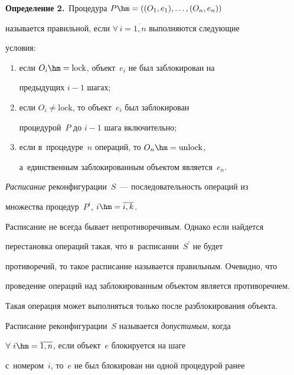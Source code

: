 \noindent


  \textbf{Определение 2.}\ Процедура $P\hm= ((O_1, e_1),\ldots , (O_n,e_n))$ 


называется правильной, если $\forall\,i=\overline{1,n}$ выполняются следующие 


условия:


  \begin{enumerate}[(1)]


\item если $O_i\hm= \mathrm{lock}$, объект~$e_i$ не был заблокирован на 


предыдущих $i-1$ шагах;


\item если $O_i\not=\mathrm{lock}$, то объект~$e_i$ был заблокирован 


процедурой~$P$ до $i-1$ шага включительно;


\item если в~процедуре~$n$ операций, то $O_n\hm=\mathrm{unlock}$, 


а~единственным заблокированным объектом является~$e_n$. 


\end{enumerate}





  \textit{Расписание} реконфигурации~$S$~--- последовательность операций из 


множества процедур~$P^i$, $i\hm= \overline{i,k}$. 


  


  Расписание не всегда бывает непротиворечивым. Однако если найдется 


перестановка операций такая, что в~расписании~$S^\prime$ не будет 


противоречий, то такое расписание называется правильным. Очевидно, что 


проведение операций над заблокированным объектом является противоречием. 


Такая операция может выполняться только после разблокирования объекта. 


  


  Расписание реконфигурации~$S$ называется \textit{допустимым}, когда 


$\forall\ i\hm=\overline{1,n}$, если объект~$e$ блокируется на шаге 


с~номером~$i$, то~$e$ не был блокирован ни одной процедурой ранее 


